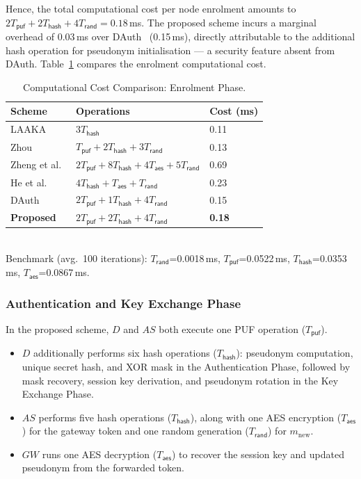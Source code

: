 \documentclass[12pt,a4paper]{report}
\begin{document}
Hence, the total computational cost per node enrolment amounts to
$2T_{\mathsf{puf}} + 2T_{\mathsf{hash}} + 4T_{\mathsf{rand}} = \mathbf{0.18}$\,ms.
The proposed scheme incurs a marginal overhead of 0.03\,ms over DAuth~\cite{das2026comsnets}
(0.15\,ms), directly attributable to the additional hash operation for pseudonym
initialisation — a security feature absent from DAuth.
Table~\ref{tab:comp_enroll} compares the enrolment computational cost.

\begin{table}[!ht]
  \centering
  \caption{Computational Cost Comparison: Enrolment Phase.}
  \label{tab:comp_enroll}
  \small
  \setlength{\tabcolsep}{5pt}
  \begin{tabular}{lll}
    \toprule
    Scheme & Operations & Cost (ms) \\
    \midrule
    LAAKA~\cite{ali2024laaka}          & $3T_\mathsf{hash}$ & 0.11 \\
    Zhou~\cite{zhou2024auth}           & $T_\mathsf{puf}+2T_\mathsf{hash}+3T_\mathsf{rand}$ & 0.13 \\
    Zheng et al.~\cite{zheng2022puf}   & $2T_\mathsf{puf}+8T_\mathsf{hash}+4T_\mathsf{aes}+5T_\mathsf{rand}$ & 0.69 \\
    He et al.~\cite{he2023lightweight} & $4T_\mathsf{hash}+T_\mathsf{aes}+T_\mathsf{rand}$ & 0.23 \\
    DAuth~\cite{das2026comsnets}        & $2T_\mathsf{puf}+1T_\mathsf{hash}+4T_\mathsf{rand}$ & 0.15 \\
    \textbf{Proposed}                  & $2T_\mathsf{puf}+2T_\mathsf{hash}+4T_\mathsf{rand}$ & \textbf{0.18} \\
    \bottomrule
  \end{tabular}\\[4pt]
  \small Benchmark (avg.\ 100 iterations): $T_\mathsf{rand}$=0.0018\,ms,
  $T_\mathsf{puf}$=0.0522\,ms, $T_\mathsf{hash}$=0.0353\,ms, $T_\mathsf{aes}$=0.0867\,ms.
\end{table}

\subsubsection{Authentication and Key Exchange Phase}

In the proposed scheme, $D$ and $AS$ both execute one PUF operation
($T_{\mathsf{puf}}$).
\begin{itemize}
  \item $D$ additionally performs six hash operations ($T_{\mathsf{hash}}$):
    pseudonym computation, unique secret hash, and XOR mask in the Authentication
    Phase, followed by mask recovery, session key derivation, and pseudonym
    rotation in the Key Exchange Phase.
  \item $AS$ performs five hash operations ($T_{\mathsf{hash}}$), along with one
    AES encryption ($T_{\mathsf{aes}}$) for the gateway token and one random
    generation ($T_{\mathsf{rand}}$) for $m_{\mathrm{new}}$.
  \item $GW$ runs one AES decryption ($T_{\mathsf{aes}}$) to recover the session
    key and updated pseudonym from the forwarded token.
\end{itemize}
\end{document}
